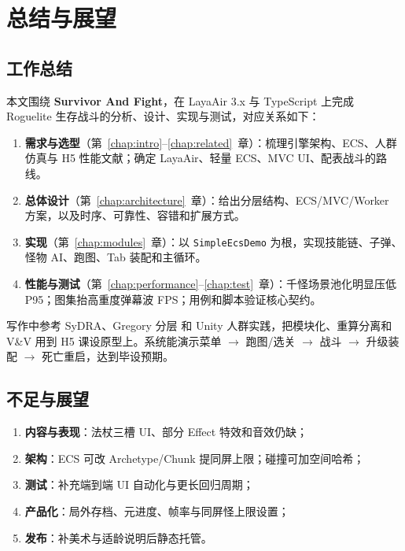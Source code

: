 \chapter{总结与展望}
\label{chap:conclusion}

\section{工作总结}

本文围绕 \textbf{Survivor And Fight}，在 LayaAir 3.x 与 TypeScript 上完成 Roguelite 生存战斗的分析、设计、实现与测试，对应关系如下：

\begin{enumerate}[label=(\arabic*)]
  \item \textbf{需求与选型}（第~\ref{chap:intro}--\ref{chap:related}~章）：梳理引擎架构、ECS、人群仿真与 H5 性能文献；确定 LayaAir、轻量 ECS、MVC UI、配表战斗的路线。
  \item \textbf{总体设计}（第~\ref{chap:architecture}~章）：给出分层结构、ECS/MVC/Worker 方案，以及时序、可靠性、容错和扩展方式。
  \item \textbf{实现}（第~\ref{chap:modules}~章）：以 \texttt{SimpleEcsDemo} 为根，实现技能链、子弹、怪物 AI、跑图、Tab 装配和主循环。
  \item \textbf{性能与测试}（第~\ref{chap:performance}--\ref{chap:test}~章）：千怪场景池化明显压低 P95；图集抬高重度弹幕波 FPS；用例和脚本验证核心契约。
\end{enumerate}

写作中参考 SyDRA\cite{ullmann2025sydra}、Gregory 分层\cite{gregory2018game} 和 Unity 人群实践\cite{cantrell2018unity}，把模块化、重算分离和 V\&V 用到 H5 课设原型上。系统能演示菜单 $\rightarrow$ 跑图/选关 $\rightarrow$ 战斗 $\rightarrow$ 升级装配 $\rightarrow$ 死亡重启，达到毕设预期。

\section{不足与展望}

\begin{enumerate}[label=\arabic*.]
  \item \textbf{内容与表现}：法杖三槽 UI、部分 Effect 特效和音效仍缺；
  \item \textbf{架构}：ECS 可改 Archetype/Chunk 提同屏上限\cite{ullmann2023coupling}；碰撞可加空间哈希；
  \item \textbf{测试}：补充端到端 UI 自动化与更长回归周期\cite{petty2010vv}；
  \item \textbf{产品化}：局外存档、元进度、帧率与同屏怪上限设置；
  \item \textbf{发布}：补美术与适龄说明后静态托管。
\end{enumerate}

